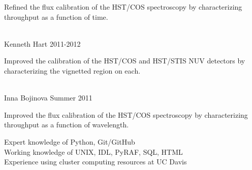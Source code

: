 \documentclass[10pt]{cv}
\begin{document}
\begin{llist}
\begin{minipage}[l]{0.7\textwidth}\vspace{0.15cm}
Refined the flux calibration of the HST/COS spectroscopy by characterizing throughput as a function of time.\\
\end{minipage}\vspace{0.15cm}
\\
Kenneth Hart \hfill 2011-2012\\
\begin{minipage}[l]{0.7\textwidth}\vspace{0.15cm}
Improved the calibration of the HST/COS and HST/STIS NUV detectors by characterizing the vignetted region on each.\\
\end{minipage}\vspace{0.15cm}
\\
Inna Bojinova \hfill Summer 2011\\
\begin{minipage}[l]{0.7\textwidth}\vspace{0.15cm}
Improved the flux calibration of the HST/COS spectroscopy by characterizing throughput as a function of wavelength.\\
\end{minipage}\vspace{0.15cm}
\vspace{-0.1in}  
Expert knowledge of Python, Git/GitHub\\
Working knowledge of UNIX, IDL, PyRAF, SQL, HTML\\
Experience using cluster computing resources at UC Davis\\ 
%

\end{llist}
\end{document}
